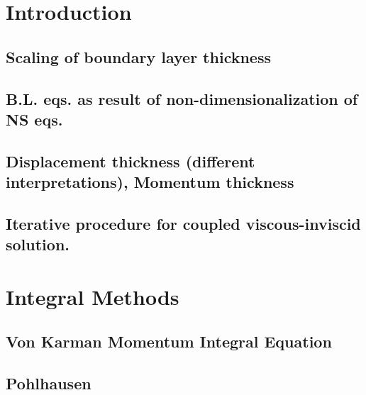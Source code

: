 \documentclass[oneside,a4paper,11pt]{report}
\begin{document}
\section{Introduction}

\subsection{Scaling of boundary layer thickness}

\subsection{B.L. eqs. as result of non-dimensionalization of NS eqs.}

\subsection{Displacement thickness (different interpretations), Momentum thickness}

\subsection{Iterative procedure for coupled viscous-inviscid solution.}

\section{Integral Methods}

\subsection{Von Karman Momentum Integral Equation}

\subsection{Pohlhausen}
\end{document}
